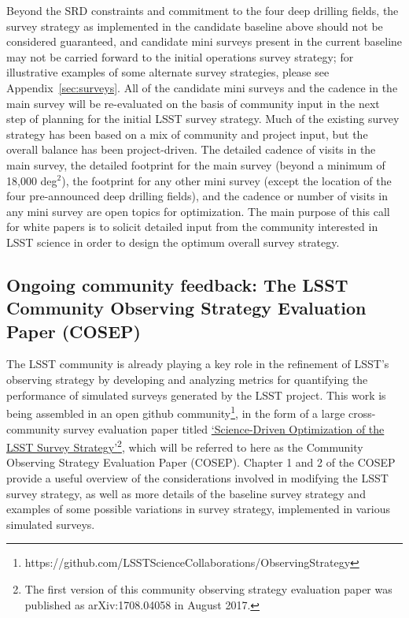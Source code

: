 \documentclass[DM,lsstdraft,toc,usenatbib]{lsstdoc}
\begin{document}
Beyond the SRD constraints and commitment to the four deep drilling fields, the survey strategy as implemented in the candidate baseline 
above should not be considered guaranteed, and candidate mini surveys present in the current baseline may not be carried forward to
the initial operations survey strategy; for illustrative examples of some alternate survey strategies, please see Appendix~\ref{sec:surveys}.
All of the candidate mini surveys and the cadence in the main survey will be re-evaluated on the basis of community input in the next 
step of planning for the initial LSST survey strategy. Much of the existing survey strategy 
has been based on a mix of community and project input, but the overall balance has been project-driven. 
The detailed cadence of visits in the main survey, the detailed footprint for the main survey (beyond a minimum of 18,000 deg$^2$), 
the footprint for any other mini survey (except the location of the four pre-announced 
deep drilling fields), and the cadence or number of visits in any mini survey are open topics for optimization. 
The main purpose of this call for white papers is to solicit detailed input from the community interested in 
LSST science in order to design the optimum overall survey strategy. 


\subsection{Ongoing community feedback: The LSST Community Observing Strategy Evaluation Paper (COSEP)}

The LSST community is already playing a key role in the refinement of LSST's observing strategy 
by developing and analyzing metrics for quantifying the performance of simulated surveys generated by
the LSST project.  This work is being assembled in an open github community\footnote{
https://github.com/LSSTScienceCollaborations/ObservingStrategy}, 
in the form of a large cross-community survey evaluation paper
titled \href{http://ls.st/9fw}{`Science-Driven Optimization of the LSST Survey Strategy'}\footnote{The first 
version of this community observing strategy evaluation paper was published as arXiv:1708.04058 in August 2017.},
which will be referred to here as the Community Observing Strategy Evaluation Paper (COSEP). 
Chapter 1 and 2 of the COSEP provide a useful overview of the considerations involved in 
modifying the LSST survey strategy, as well as more details of the baseline survey strategy and 
examples of some possible variations in survey strategy, implemented in various simulated surveys.
\end{document}
